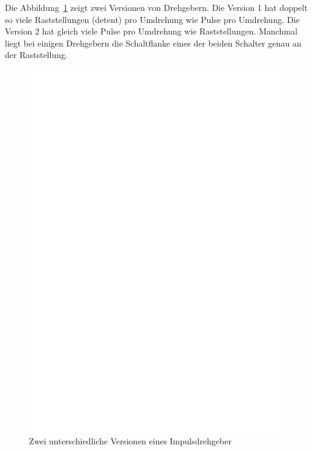 Die Abbildung~\ref{fig:RotEnc} zeigt zwei Versionen von Drehgebern.
Die Version 1 hat doppelt so viele Raststellungen (detent) pro Umdrehung
wie Pulse pro Umdrehung.
Die Version 2 hat gleich viele Pulse pro Umdrehung wie Raststellungen.
Manchmal liegt bei einigen Drehgebern die Schaltflanke eines der beiden Schalter genau an der
Raststellung.

\begin{figure}[H]
\centering
\includegraphics[width=14cm]{../FIG/rotary_encoder.eps}
\caption{Zwei unterschiedliche Versionen eines Impulsdrehgeber}
\label{fig:RotEnc}
\end{figure}

